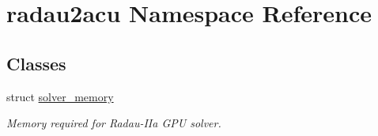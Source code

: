 \hypertarget{namespaceradau2acu}{}\section{radau2acu Namespace Reference}
\label{namespaceradau2acu}
\subsection*{Classes}
\begin{DoxyCompactItemize}
\item 
struct \hyperlink{structradau2acu_1_1solver__memory}{solver\+\_\+memory}
\begin{DoxyCompactList}\small\item\em Memory required for Radau-\/\+I\+Ia G\+PU solver. \end{DoxyCompactList}\end{DoxyCompactItemize}
